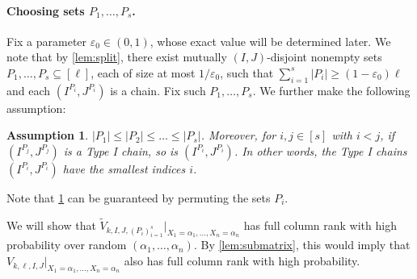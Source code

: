 \documentclass[11pt]{article}
\theoremstyle{plain}
\newtheorem{assumption}{Assumption}
\theoremstyle{definition}
\theoremstyle{remark}
\newcommand{\eps}{\varepsilon}
\begin{document}
\paragraph{Choosing sets $P_1,\dots,P_s$.}
Fix a parameter $\eps_0\in (0,1)$, whose exact value will be determined later. 
We note that by 
\cref{lem:split}, there exist mutually $(I,J)$-disjoint nonempty sets $P_1,\dots,P_s\subseteq [\ell]$, each of size at most $1/\eps_0$, such that $\sum_{i=1}^s |P_i|\geq (1-\eps_0)\ell$ and each $(I^{P_i}, J^{P_i})$ is a chain.
Fix such $P_1,\dots,P_s$.
We further make the following assumption:
\begin{assumption}\label{order-on-Pi}
$|P_1|\leq |P_2|\leq \dots \leq |P_s|$. Moreover, for $i,j\in [s]$ with $i<j$, if $(I^{P_j}, J^{P_j})$ is a Type I chain, so is $(I^{P_i}, J^{P_i})$. In other words, the Type I chains $(I^{P_i}, J^{P_i})$ have the smallest indices $i$.
\end{assumption}
Note that \cref{order-on-Pi} can be guaranteed by permuting the sets $P_i$. 

We will show that $\widetilde{V}_{k,I,J,(P_i)_{i=1}^s}|_{X_1=\alpha_1,\dots,X_n=\alpha_n}$ has full column rank with high probability over random $(\alpha_1,\dots,\alpha_n)$. By \cref{lem:submatrix}, this would imply that $V_{k,\ell,I,J}|_{X_1=\alpha_1,\dots,X_n=\alpha_n}$ also has full column rank with high probability.
\end{document}
